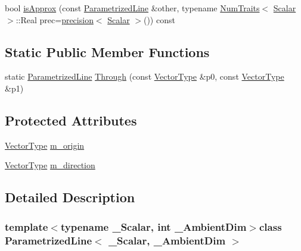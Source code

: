 \begin{DoxyCompactItemize}
\item 
bool \hyperlink{class_parametrized_line_a956329d58fcbdd7a910a3cae90e0f6d9}{is\-Approx} (const \hyperlink{class_parametrized_line}{Parametrized\-Line} \&other, typename \hyperlink{struct_num_traits}{Num\-Traits}$<$ \hyperlink{class_parametrized_line_ac4e083e5a62740e45d2158c6692b2115}{Scalar} $>$\-::Real prec=\hyperlink{_math_functions_8h_a3dc1c65cf9dc9b5a7ee66472d0ae83e1}{precision}$<$ \hyperlink{class_parametrized_line_ac4e083e5a62740e45d2158c6692b2115}{Scalar} $>$()) const 
\end{DoxyCompactItemize}
\subsection*{Static Public Member Functions}
\begin{DoxyCompactItemize}
\item 
static \hyperlink{class_parametrized_line}{Parametrized\-Line} \hyperlink{class_parametrized_line_ac4bfeef3e46746a68dbd08e0b61400e3}{Through} (const \hyperlink{class_parametrized_line_a50da4abea0ab33894502d66459f261ba}{Vector\-Type} \&p0, const \hyperlink{class_parametrized_line_a50da4abea0ab33894502d66459f261ba}{Vector\-Type} \&p1)
\end{DoxyCompactItemize}
\subsection*{Protected Attributes}
\begin{DoxyCompactItemize}
\item 
\hyperlink{class_parametrized_line_a50da4abea0ab33894502d66459f261ba}{Vector\-Type} \hyperlink{class_parametrized_line_a4a8e8e1f3df3d07c9170ed3a94f81138}{m\-\_\-origin}
\item 
\hyperlink{class_parametrized_line_a50da4abea0ab33894502d66459f261ba}{Vector\-Type} \hyperlink{class_parametrized_line_a0c55dd57c800ae31aabfe572e88221c2}{m\-\_\-direction}
\end{DoxyCompactItemize}


\subsection{Detailed Description}
\subsubsection*{template$<$typename \-\_\-\-Scalar, int \-\_\-\-Ambient\-Dim$>$class Parametrized\-Line$<$ \-\_\-\-Scalar, \-\_\-\-Ambient\-Dim $>$}

